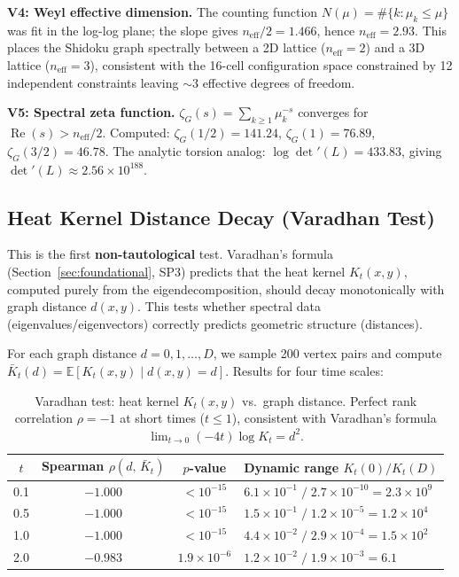 \documentclass[11pt]{article}
\theoremstyle{definition}
\theoremstyle{remark}
\begin{document}
\textbf{V4: Weyl effective dimension.} The counting function $N(\mu) = \#\{k : \mu_k \le \mu\}$ was fit in the log-log plane; the slope gives $n_{\mathrm{eff}}/2 = 1.466$, hence $n_{\mathrm{eff}} = 2.93$. This places the Shidoku graph spectrally between a 2D lattice ($n_{\mathrm{eff}} = 2$) and a 3D lattice ($n_{\mathrm{eff}} = 3$), consistent with the 16-cell configuration space constrained by 12 independent constraints leaving $\sim 3$ effective degrees of freedom.

\textbf{V5: Spectral zeta function.} $\zeta_G(s) = \sum_{k \ge 1} \mu_k^{-s}$ converges for $\operatorname{Re}(s) > n_{\mathrm{eff}}/2$. Computed: $\zeta_G(1/2) = 141.24$, $\zeta_G(1) = 76.89$, $\zeta_G(3/2) = 46.78$. The analytic torsion analog: $\log\det'(L) = 433.83$, giving $\det'(L) \approx 2.56 \times 10^{188}$.


\subsection{Heat Kernel Distance Decay (Varadhan Test)}

This is the first \textbf{non-tautological} test. Varadhan's formula (Section~\ref{sec:foundational}, SP3) predicts that the heat kernel $K_t(x,y)$, computed purely from the eigendecomposition, should decay monotonically with graph distance $d(x,y)$. This tests whether spectral data (eigenvalues/eigenvectors) correctly predicts geometric structure (distances).

For each graph distance $d = 0, 1, \ldots, D$, we sample 200 vertex pairs and compute $\bar{K}_t(d) = \mathbb{E}[K_t(x,y) \mid d(x,y) = d]$. Results for four time scales:

\begin{table}[h]
\centering
\begin{tabular}{cccl}
\toprule
$t$ & Spearman $\rho(d,\, \bar{K}_t)$ & $p$-value & Dynamic range $K_t(0)/K_t(D)$ \\
\midrule
0.1 & $-1.000$ & $< 10^{-15}$ & $6.1 \times 10^{-1} \;/\; 2.7 \times 10^{-10} = 2.3 \times 10^{9}$ \\
0.5 & $-1.000$ & $< 10^{-15}$ & $1.5 \times 10^{-1} \;/\; 1.2 \times 10^{-5} = 1.2 \times 10^{4}$ \\
1.0 & $-1.000$ & $< 10^{-15}$ & $4.4 \times 10^{-2} \;/\; 2.9 \times 10^{-4} = 1.5 \times 10^{2}$ \\
2.0 & $-0.983$ & $1.9 \times 10^{-6}$ & $1.2 \times 10^{-2} \;/\; 1.9 \times 10^{-3} = 6.1$ \\
\bottomrule
\end{tabular}
\caption{Varadhan test: heat kernel $K_t(x,y)$ vs.\ graph distance. Perfect rank correlation $\rho = -1$ at short times ($t \le 1$), consistent with Varadhan's formula $\lim_{t \to 0}(-4t)\log K_t = d^2$.}
\label{tab:varadhan}
\end{table}
\end{document}
